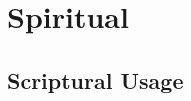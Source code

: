 \section{Spiritual}
	\label{SPIRITUAL}
	





\subsection{Scriptural Usage} %
	\label{SPIRITUAL-SCRIPTURES}

	
	
